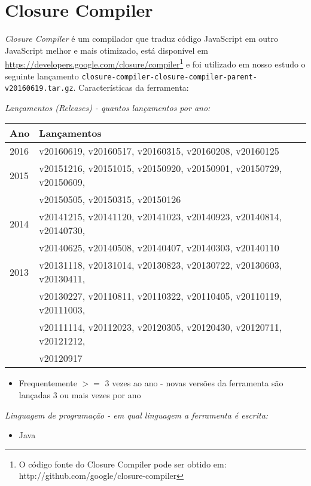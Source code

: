 \section{Closure Compiler}

{\it Closure Compiler} é um compilador que traduz código JavaScript em outro
JavaScript melhor e mais otimizado, está disponível em
\url{https://developers.google.com/closure/compiler}\footnote{O código fonte do
Closure Compiler pode ser obtido em:
http://github.com/google/closure-compiler} e foi utilizado em nosso estudo o
seguinte lançamento
\texttt{closure-compiler-closure-compiler-parent-v20160619.tar.gz}.
Características da ferramenta:

\begin{description}

  \item {\it Lançamentos ({\it Releases}) - quantos lançamentos por ano:}
    \begin{table}[h!]
      \centering
      \begin{tabular}{| l | l |}
        \hline
        Ano  & Lançamentos                              \\
        \hline
        2016 & v20160619, v20160517, v20160315, v20160208, v20160125 \\
        2015 & v20151216, v20151015, v20150920, v20150901, v20150729, v20150609, \\
             & v20150505, v20150315, v20150126 \\
        2014 & v20141215, v20141120, v20141023, v20140923, v20140814, v20140730, \\
             & v20140625, v20140508, v20140407, v20140303, v20140110 \\
        2013 & v20131118, v20131014, v20130823, v20130722, v20130603, v20130411, \\
             & v20130227, v20110811, v20110322, v20110405, v20110119, v20111003, \\
             & v20111114, v20112023, v20120305, v20120430, v20120711, v20121212, \\
             & v20120917 \\
        \hline
      \end{tabular}
    \end{table}
    \begin{itemize}
      \item Frequentemente $>=$ 3 vezes ao ano - novas versões da ferramenta são lançadas 3 ou mais vezes por ano
    \end{itemize}

  \item {\it Linguagem de programação - em qual linguagem a ferramenta é escrita:}
    \begin{itemize}
      \item Java
    \end{itemize}

\end{description}

